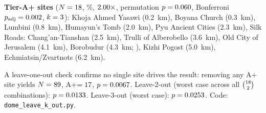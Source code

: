\documentclass[HARVARD,twocolumn]{USG}
\begin{document}
\begin{table}[!t]
\centering
\caption{UNESCO domed/spherical monument test ($N = \NcircTotal$, raw keyword sweep).
  Primary evidence against the chance explanation: simulation permutation
  $Z = \simDomePermZ$, $p = \simDomePermP$ (\S\ref{sec:simulation_null}).
  Exact binomial results are reference baselines assuming uniform longitude
  spacing. The non-significant $\chi^2$ is discussed in the text.}
\label{tab:circularstats}
\end{table}

\noindent\textbf{Tier-A+ sites} ($N = 18$, \NcircApRate\%, $2.00\times$,
permutation $p = \simDomePermP$,
Bonferroni $p_\mathrm{adj} = 0.002$, $k = 3$):
Khoja Ahmed Yasawi (0.2~km),
Boyana Church (0.3~km),
Lumbini (0.8~km),
Humayun's Tomb (2.0~km),
Pyu Ancient Cities (2.3~km),
Silk Roads: Chang'an-Tianshan (2.5~km), Trulli of Alberobello (3.6~km),
Old City of Jerusalem (4.1~km),
Borobudur (4.3~km; \citealt{miksic1990borobudur}),
Kizhi Pogost (5.0~km), Echmiatsin/Zvartnots (6.2~km).

A leave-one-out check confirms no single site drives the result:
removing any A+ site yields $N = 89$, A+$= 17$,
$p = 0.0067$.
Leave-2-out (worst case across all $\binom{18}{2}$ combinations):
$p = 0.0133$.
Leave-3-out (worst case): $p = 0.0253$.
Code: \texttt{dome\_leave\_k\_out.py}.
\end{document}
